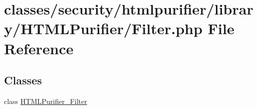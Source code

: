\hypertarget{Filter_8php}{\section{classes/security/htmlpurifier/library/\+H\+T\+M\+L\+Purifier/\+Filter.php File Reference}
\label{Filter_8php}
}
\subsection*{Classes}
\begin{DoxyCompactItemize}
\item 
class \hyperlink{classHTMLPurifier__Filter}{H\+T\+M\+L\+Purifier\+\_\+\+Filter}
\end{DoxyCompactItemize}
